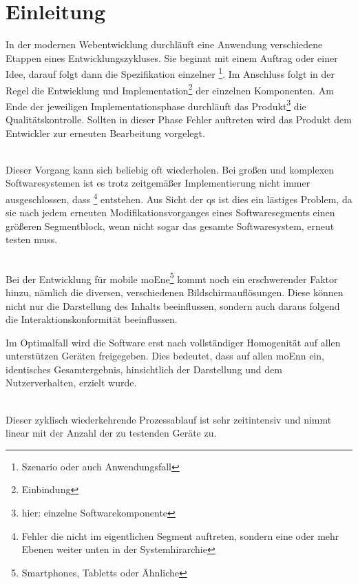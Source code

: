 \chapter{Einleitung}

In der modernen Webentwicklung durchläuft eine Anwendung verschiedene Etappen eines Entwicklungszykluses. Sie beginnt mit einem Auftrag oder einer Idee, darauf folgt dann die Spezifikation einzelner \footnote{Szenario oder auch Anwendungsfall}. Im Anschluss folgt in der Regel die Entwicklung und Implementation\footnote{Einbindung} der einzelnen Komponenten. Am Ende der jeweiligen Implementationsphase durchläuft das Produkt\footnote{hier: einzelne Softwarekomponente} die Qualitätskontrolle. Sollten in dieser Phase Fehler auftreten wird das Produkt dem Entwickler zur erneuten Bearbeitung vorgelegt.

\\Dieser Vorgang kann sich beliebig oft wiederholen. Bei großen und komplexen Softwaresystemen ist es trotz zeitgemäßer Implementierung nicht immer ausgeschlossen, dass \footnote{Fehler die nicht im eigentlichen Segment auftreten, sondern eine oder mehr Ebenen weiter unten in der Systemhirarchie} entstehen. Aus Sicht der \Gls{qs} ist dies ein lästiges Problem, da sie  nach jedem erneuten Modifikationsvorganges eines Softwaresegments einen größeren Segmentblock, wenn nicht sogar das gesamte Softwaresystem, erneut testen muss.

\\Bei der Entwicklung für mobile \Gls{moEn}e\footnote{Smartphones, \Gls{Tablet}ts  oder Ähnliche} kommt noch ein erschwerender Faktor hinzu, nämlich die diversen, verschiedenen Bildschirmauflösungen. Diese können nicht nur die Darstellung des Inhalts beeinflussen, sondern auch daraus folgend die Interaktionskonformität beeinflussen.


Im Optimalfall wird die Software erst nach vollständiger Homogenität auf allen unterstützen Geräten freigegeben. Dies bedeutet, dass auf allen \Gls{moEn}n ein, identisches Gesamtergebnis, hinsichtlich der Darstellung und dem Nutzerverhalten, erzielt wurde. 

\\Dieser zyklisch wiederkehrende Prozessablauf ist sehr zeitintensiv und nimmt linear mit der Anzahl der zu testenden Geräte zu.

